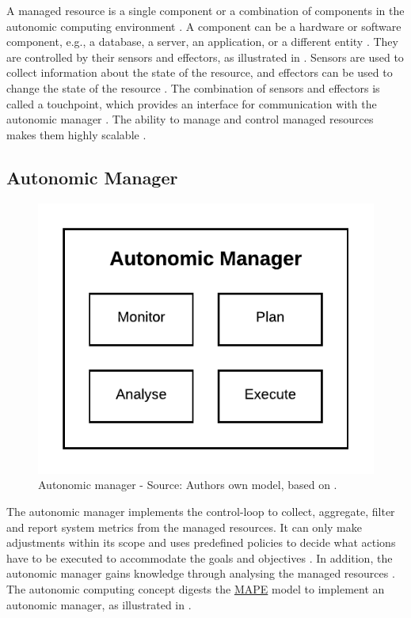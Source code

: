A managed resource is a single component or a combination of components in the autonomic computing environment \cite{Murch2004Autonomic, Jacob2004AutonomicSolution}. A component can be a hardware or software component, e.g., a database, a server, an application, or a different entity \cite{Sinreich2006AnAB}.
They are controlled by their sensors and effectors, as illustrated in . Sensors are used to collect information about the state of the resource, and effectors can be used to change the state of the resource \cite{Jacob2004AutonomicSolution}. The combination of sensors and effectors is called a touchpoint, which provides an interface for communication with the autonomic manager \cite{Sinreich2006AnAB}.
The ability to manage and control managed resources makes them highly scalable \cite{Murch2004Autonomic}.


\subsection{Autonomic Manager}
\label{subsec:02_ac_manager}

\begin{figure}[h]
\centering
\includegraphics[scale=1]{images/02_theoretical_foundation/autonomic_computing/autonomic_manager}
\caption{Autonomic manager - Source: Authors own model, based on \cite{Jacob2004AutonomicSolution}.}
\label{fig:ac_manager}
\end{figure}

The autonomic manager implements the control-loop to collect, aggregate, filter and report system metrics from the managed resources. It can only make adjustments within its scope and uses predefined policies to decide what actions have to be executed to accommodate the goals and objectives \cite{Murch2004Autonomic, Sinreich2006AnAB}.
In addition, the autonomic manager gains knowledge through analysing the managed resources \cite{Murch2004Autonomic}.
The autonomic computing concept digests the \hyperlink{abbr:mape}{MAPE} model to implement an autonomic manager, as illustrated in  \cite{Goscinski2011CloudComputing}.


